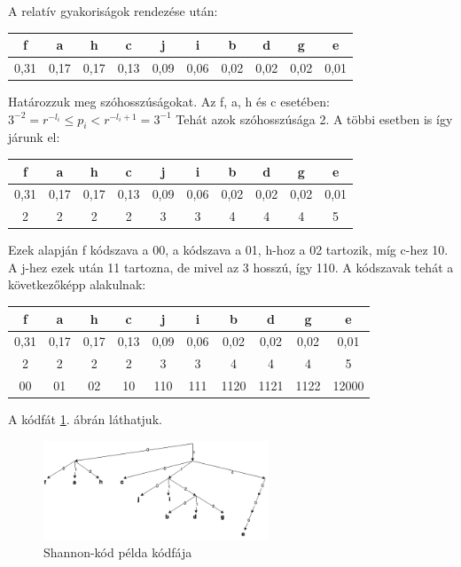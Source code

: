 \documentclass[margin=0px]{article}
\begin{document}
\begin{description}
        A relatív gyakoriságok rendezése után:

        \begin{tabular}{|c|c|c|c|c|c|c|c|c|c|}
            \hline f    & a    & h    & c    & j    & i    & b    & d    & g    & e    \\
            \hline 0,31 & 0,17 & 0,17 & 0,13 & 0,09 & 0,06 & 0,02 & 0,02 & 0,02 & 0,01 \\
            \hline
        \end{tabular}

        Határozzuk meg szóhosszúságokat. Az f, a, h és c esetében: $3^{-2} = r^{-l_i} \leq p_i < r^{-l_i+1} = 3^{-1} $ Tehát azok szóhosszúsága 2. A többi esetben is így járunk el:

        \begin{tabular}{|c|c|c|c|c|c|c|c|c|c|}
            \hline f    & a    & h    & c    & j    & i    & b    & d    & g    & e    \\
            \hline 0,31 & 0,17 & 0,17 & 0,13 & 0,09 & 0,06 & 0,02 & 0,02 & 0,02 & 0,01 \\
            \hline 2    & 2    & 2    & 2    & 3    & 3    & 4    & 4    & 4    & 5    \\
            \hline
        \end{tabular}

        Ezek alapján f kódszava a 00, a kódszava a 01, h-hoz a 02 tartozik, míg c-hez 10. A j-hez ezek után 11 tartozna, de mivel az 3 hosszú, így 110.
        A kódszavak tehát a következőképp alakulnak:

        \begin{tabular}{|c|c|c|c|c|c|c|c|c|c|}
            \hline f    & a    & h    & c    & j    & i    & b    & d    & g    & e     \\
            \hline 0,31 & 0,17 & 0,17 & 0,13 & 0,09 & 0,06 & 0,02 & 0,02 & 0,02 & 0,01  \\
            \hline 2    & 2    & 2    & 2    & 3    & 3    & 4    & 4    & 4    & 5     \\
            \hline 00   & 01   & 02   & 10   & 110  & 111  & 1120 & 1121 & 1122 & 12000 \\
            \hline
        \end{tabular}

        A kódfát \ref{fig:shannon}. ábrán láthatjuk.

        \begin{figure}[H]
            \centering
            \includegraphics[width=0.6\textwidth]{img/shannon.png}
            \caption{Shannon-kód példa kódfája}
            \label{fig:shannon}
        \end{figure}


\end{description}
\end{document}
